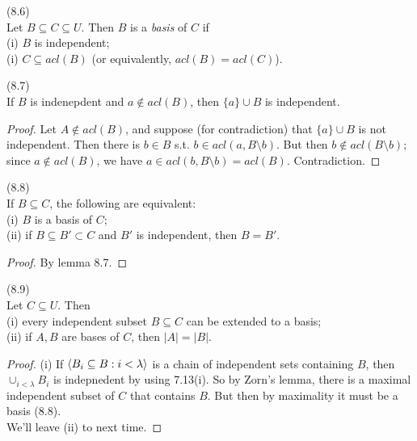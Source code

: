 \documentclass[a4paper]{article}
\begin{document}
\begin{defi} (8.6)\\
    Let $B \subseteq C \subseteq U$. Then $B$ is a \emph{basis} of $C$ if\\
    (i) $B$ is independent;\\
    (i) $C \subseteq acl(B)$ (or equivalently, $acl(B) = acl(C)$).
\end{defi}

\begin{lemma} (8.7)\\
    If $B$ is indenepdent and $a \not\in acl(B)$, then $\{a\} \cup B$ is independent.\\
    \begin{proof}
        Let $A \not\in acl(B)$, and suppose (for contradiction) that $\{a\} \cup B$ is not independent. Then there is $b \in B$ s.t. $b \in acl(a,B \setminus b)$. But then $b \not\in acl(B \setminus b)$; since $a \not\in acl(B)$, we have $a \in acl(b,B\setminus b) = acl(B)$. Contradiction.
    \end{proof}
\end{lemma}

\begin{coro} (8.8)\\
    If $B \subseteq C$, the following are equivalent:\\
    (i) $B$ is a basis of $C$;\\
    (ii) if $B \subseteq B' \subset C$ and $B'$ is independent, then $B=B'$.
    \begin{proof}
        By lemma 8.7.
    \end{proof}
\end{coro}

\begin{thm} (8.9)\\
    Let $C \subseteq U$. Then \\
    (i) every independent subset $B \subseteq C$ can be extended to a basis;\\
    (ii) if $A,B$ are bases of $C$, then $|A| = |B|$.
    \begin{proof}
        (i) If $\langle B_i \subseteq B:i < \lambda \rangle$ is a chain of independent sets containing $B$, then $\cup_{i < \lambda} B_i$ is indepnedent by using 7.13(i). So by Zorn's lemma, there is a maximal independent subset of $C$ that contains $B$. But then by maximality it must be a basis (8.8).\\
        We'll leave (ii) to next time.
    \end{proof}
\end{thm}
\end{document}
